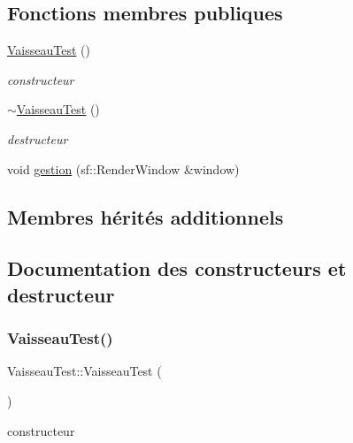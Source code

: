 \subsection*{Fonctions membres publiques}
\begin{DoxyCompactItemize}
\item 
\hyperlink{class_vaisseau_test_acbe01fc8952d9c6fd52cbf311a92c903}{Vaisseau\+Test} ()
\begin{DoxyCompactList}\small\item\em constructeur \end{DoxyCompactList}\item 
\hyperlink{class_vaisseau_test_ada9b5788bc092ecede953248cd6133e8}{$\sim$\+Vaisseau\+Test} ()
\begin{DoxyCompactList}\small\item\em destructeur \end{DoxyCompactList}\item 
void \hyperlink{class_vaisseau_test_acf5f5ea1e9317cbc5a4c445016cd767c}{gestion} (sf\+::\+Render\+Window \&window)
\end{DoxyCompactItemize}
\subsection*{Membres hérités additionnels}


\subsection{Documentation des constructeurs et destructeur}
\mbox{\label{class_vaisseau_test_acbe01fc8952d9c6fd52cbf311a92c903}} 
\subsubsection{\texorpdfstring{Vaisseau\+Test()}{VaisseauTest()}}
{\footnotesize\ttfamily Vaisseau\+Test\+::\+Vaisseau\+Test (\begin{DoxyParamCaption}{ }\end{DoxyParamCaption})}



constructeur 

\mbox{\label{class_vaisseau_test_ada9b5788bc092ecede953248cd6133e8}} 
